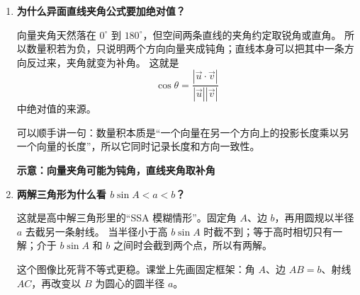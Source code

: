 \documentclass[11pt,a4paper]{ctexart}
\begin{document}
\begin{enumerate}[label=\arabic*. , leftmargin=2em, itemsep=0.9em]
  \item \textbf{为什么异面直线夹角公式要加绝对值？}
  
  向量夹角天然落在 \(0^\circ\) 到 \(180^\circ\)，但空间两条直线的夹角约定取锐角或直角。
  所以数量积若为负，只说明两个方向向量夹成钝角；直线本身可以把其中一条方向反过来，夹角就变为补角。
  这就是
  \[
    \cos\theta=\frac{|\vec u\cdot\vec v|}{|\vec u||\vec v|}
  \]
  中绝对值的来源。
  
  可以顺手讲一句：数量积本质是“一个向量在另一个方向上的投影长度乘以另一个向量的长度”，所以它同时记录长度和方向一致性。

  \begin{center}
    \par\vspace{0.2em}
    {\small\textbf{示意：向量夹角可能为钝角，直线夹角取补角}}
  \end{center}
  
  \item \textbf{两解三角形为什么看 \(b\sin A<a<b\)？}
  
  这就是高中解三角形里的“SSA 模糊情形”。固定角 \(A\)、边 \(b\)，再用圆规以半径 \(a\) 去截另一条射线。
  当半径小于高 \(b\sin A\) 时截不到；等于高时相切只有一解；介于 \(b\sin A\) 和 \(b\) 之间时会截到两个点，所以有两解。
  
  这个图像比死背不等式更稳。课堂上先画固定框架：角 \(A\)、边 \(AB=b\)、射线 \(AC\)，再改变以 \(B\) 为圆心的圆半径 \(a\)。


\end{enumerate}
\end{document}
